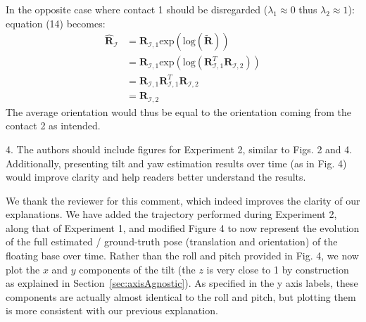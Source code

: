 In the opposite case where contact 1 should be disregarded ($\lambda_{1} \approx 0$ thus $\lambda_{2} \approx 1$): equation (14) becomes: 
\begin{align}
    \hat{\boldsymbol{R}}_{\mathcal{I}}& = \boldsymbol{R}_{\mathcal{I}, 1} \text{exp} \left(  \text{log} \left( \tilde{\boldsymbol{R}}\right)  \right) \\
    & = \boldsymbol{R}_{\mathcal{I}, 1} \text{exp} \left( \text{log} \left( \boldsymbol{R}^{T}_{\mathcal{I}, 1} \boldsymbol{R}_{\mathcal{I}, 2}\right)  \right)\\
    & = \boldsymbol{R}_{\mathcal{I}, 1}  \boldsymbol{R}^{T}_{\mathcal{I}, 1} \boldsymbol{R}_{\mathcal{I}, 2} \\
    & =  \boldsymbol{R}_{\mathcal{I}, 2} 
\end{align} 
The average orientation would thus be equal to the orientation coming from the contact 2 as intended.

\begin{revquote}
4. The authors should include figures for Experiment 2, similar to Figs. 2 and 4. Additionally, presenting tilt and yaw estimation results over time (as in Fig. 4) would improve clarity and help readers better understand the results.
\end{revquote}

We thank the reviewer for this comment, which indeed improves the clarity of our explanations. We have added the trajectory performed during Experiment 2, along that of Experiment 1, and modified Figure 4 to now represent the evolution of the full estimated / ground-truth pose (translation and orientation) of the floating base over time. Rather than the roll and pitch provided in Fig. 4, we now plot the $x$ and $y$ components of the tilt (the $z$ is very close to 1 by construction as explained in Section~\ref{sec:axisAgnostic}). As specified in the y axis labels, these components are actually almost identical to the roll and pitch, but plotting them is more consistent with our previous explanation.